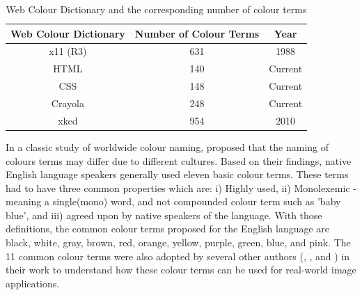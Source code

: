 \begin{table}[hbt!]
\centering
\begin{tabular}{|c|c|c|}
\hline
\multicolumn{1}{|c|}{\textbf{Web Colour Dictionary}} & \multicolumn{1}{c|}{\textbf{Number of Colour Terms}} & \multicolumn{1}{c|}{\textbf{Year}} \\ \hline
x11 (R3)                                            & 631                                                 & 1988                               \\ \hline
HTML                                                & 140                                                 & Current                            \\ \hline
CSS                                                 & 148                                                 & Current                            \\ \hline
Crayola                                             & 248                                                 & Current                            \\ \hline
xkcd                                                & 954                                                 & 2010                               \\ \hline
\end{tabular}
\caption[Web Colour Dictionary and the corresponding number of colour terms]{Web Colour Dictionary and the corresponding number of colour terms}
\label{table:allcolourterms}
\end{table}




In a classic study of worldwide colour naming,  proposed that the naming of colours terms may differ due to different cultures. Based on their findings, native English language speakers generally used eleven basic colour terms. These terms had to have three common properties which are: i) Highly used, ii) Monolexemic - meaning a single(mono) word, and not compounded colour term such as 'baby blue', and iii) agreed upon by native speakers of the language. With those definitions, the common colour terms proposed for the English language are black, white, gray, brown, red, orange, yellow, purple, green, blue, and pink. The 11 common colour terms were also adopted by several other authors  (, , and ) in their work to understand how these colour terms can be used for real-world image applications.







